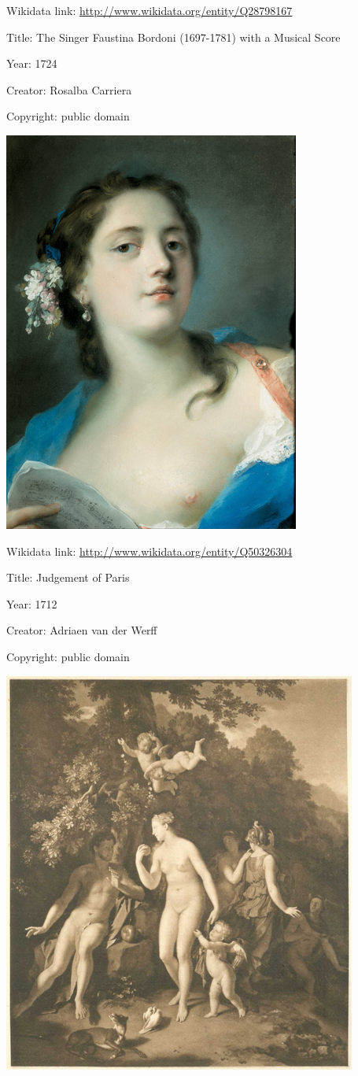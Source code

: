 \documentclass[
  letterpaper,
]{book}
\begin{document}
Wikidata link: \url{http://www.wikidata.org/entity/Q28798167}

Title: The Singer Faustina Bordoni (1697-1781) with a Musical Score

Year: 1724

Creator: Rosalba Carriera

Copyright: public domain

\includegraphics{paintings_files/figure-pdf/cell-2-output-10.png}

Wikidata link: \url{http://www.wikidata.org/entity/Q50326304}

Title: Judgement of Paris

Year: 1712

Creator: Adriaen van der Werff

Copyright: public domain

\includegraphics{paintings_files/figure-pdf/cell-2-output-12.png}
\end{document}
